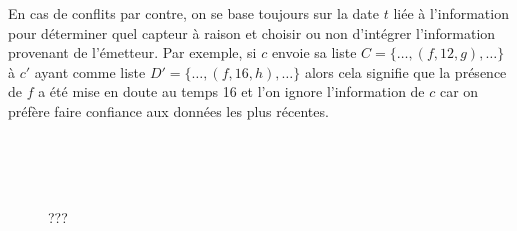 \documentclass[10pt]{article}
\begin{document}
\begin{multicols}{2}
En cas de conflits par contre, on se base toujours sur la date $t$
liée à l'information pour déterminer quel capteur à raison et choisir
ou non d'intégrer l'information provenant de l'émetteur. Par exemple,
si $c$ envoie sa liste $C = \{\dots,(f,12,g),\dots\}$ à $c'$ ayant
comme liste $D' = \{\dots,(f,16,h),\dots\}$ alors cela signifie que la
présence de $f$ a été mise en doute au temps 16 et l'on ignore
l'information de $c$ car on préfère faire confiance aux données les
plus récentes.

\end{multicols}

\begin{figure}[p]

  \centering

  \subfloat[]{}\\
  \subfloat[]{}\\
  \subfloat[]{}\\

  \caption{???}
  \label{test}

\end{figure}
\end{document}
